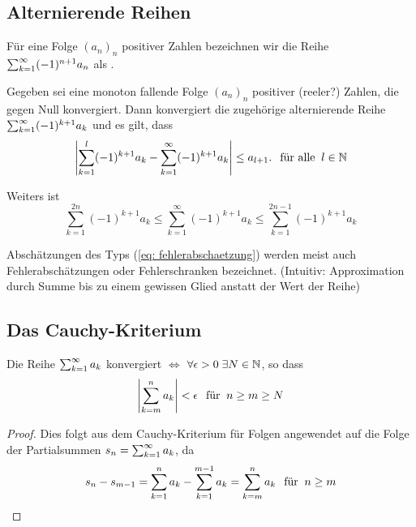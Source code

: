 \subsection{Alternierende Reihen}

Für eine Folge $(a_n)_n$ positiver Zahlen bezeichnen wir die Reihe $\sumkinfty (-1)^{n+1}a_n$ als .

\begin{thm}
	Gegeben sei eine monoton fallende Folge $(a_n)_n$ positiver (reeler?) Zahlen, die gegen Null konvergiert. Dann konvergiert die zugehörige alternierende Reihe $\sumkinfty (-1)^{k+1} a_k$ und es gilt, dass
	\begin{equation}
		\label{eq: fehlerabschaetzung}
		\left | \sumkonetilll (-1)^{k+1} a_k - \sumkinfty (-1)^{k+1} a_k \right | \leq a_{l+1}. \fueralle l\in \nat
	\end{equation}

	Weiters ist
	\begin{equation}
		\sum_{k=1}^{2n} (-1)^{k+1} a_k \leq \sum_{k=1}^{\infty} (-1)^{k+1} a_k \leq \sum_{k=1}^{2n-1} (-1)^{k+1}a_k
	\end{equation}

	Abschätzungen des Typs (\autoref{eq: fehlerabschaetzung}) werden meist auch Fehlerabschätzungen oder Fehlerschranken bezeichnet. (Intuitiv: Approximation durch Summe bis zu einem gewissen Glied anstatt der Wert der Reihe)
\end{thm}


\subsection{Das Cauchy-Kriterium}

\begin{thm} Die Reihe $\sumkinfty a_k$ konvergiert $\iff$ $\forall \epsilon > 0 \; \exists N \in \nat$, so dass
	\begin{equation}
		\left | \sum_{k=m}^{n} a_k \right | < \epsilon \fuer n \geq m \geq N
	\end{equation}
\end{thm}
\begin{proof}
	Dies folgt aus dem Cauchy-Kriterium für Folgen angewendet auf die Folge der Partialsummen $s_n=\sumkinfty a_k$, da
	\begin{equation}
				s_n - s_{m-1} = \sum_{k=1}^n a_k - \sum_{k=1}^{m-1} a_k = \sum_{k=m}^n a_k \fuer n \geq m
	\end{equation}
\end{proof}

